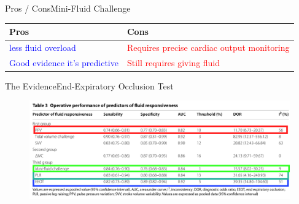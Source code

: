 \documentclass{beamer}
\newcommand{\pro}{\textcolor{blue}}
\newcommand{\con}{\textcolor{red}}
\begin{document}
			\begin{frame}{Pros / Cons}{Mini-Fluid Challenge}
				\begin{center}
					\begin{tabular}{l||l}
						\textbf{Pros} & \textbf{Cons} \\	
						\hline
						\pro{less fluid overload} & \con{Requires precise cardiac output monitoring} \\
						\hline
						\pro{Good evidence it's predictive} & \con{Still requires giving fluid}
					\end{tabular}
				\end{center}
			\end{frame}
			\begin{frame}{The Evidence}{End-Expiratory Occlusion Test}
					\begin{figure}
						\centering
						\includegraphics[width=0.9\linewidth]{figures/responsivenessMethodsCompared-4}
						\label{fig:responsivenessmethodscompared-4}
					\end{figure}
			\end{frame}
\end{document}
